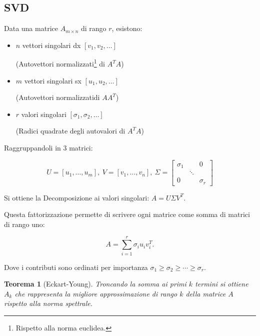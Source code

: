 \documentclass{article}
\newtheorem{theorem}{Teorema}
\begin{document}

\newpage

\subsection{SVD}

Data una matrice $A_{m\times n}$ di rango $r$, esistono:
\begin{itemize}
    \item $n$ vettori singolari dx $[v_1,v_2,\ldots]$

        (Autovettori normalizzati\footnote{Rispetto alla norma euclidea.} di $A^TA$)
    
    \item $m$ vettori singolari sx $[u_1,u_2,\ldots]$

        (Autovettori normalizzati\footnotemark[3] di $AA^T$)
    
    \item $r$ valori singolari $[\sigma_1,\sigma_2,\ldots]$

        (Radici quadrate degli autovalori di $A^TA$)\newline
    
\end{itemize}


Raggruppandoli in 3 matrici:

\[
U=[u_1,\ldots,u_m],
\
V=[v_1,\ldots,v_n],\
\Sigma=
\begin{bmatrix}
\sigma_1        &        & 0\\
                 &\ddots  & \\
0                &        &\sigma_r
\end{bmatrix}
\]

\vspace{5pt}

Si ottiene la Decomposizione ai valori singolari: $A=U\Sigma V^T$.\newline

Questa fattorizzazione permette di scrivere ogni matrice come somma di matrici di rango uno:

\[
A=
\sum_{i=1}^{r}
\sigma_i u_iv_i^T.
\]

\vspace{5pt}

Dove i contributi sono ordinati per importanza $\sigma_1\ge\sigma_2\ge\cdots\ge\sigma_r$.\newline

\begin{theorem}[Eckart-Young]
    Troncando la somma ai primi $k$ termini si ottiene \(A_k\) che rappresenta la migliore approssimazione di rango \(k\) della matrice \(A\) rispetto alla norma spettrale.\newline
\end{theorem}
\end{document}
